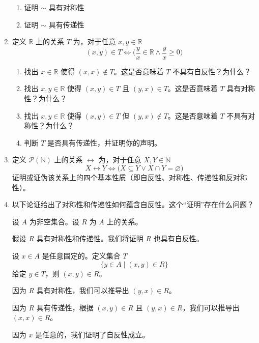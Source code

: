 \begin{enumerate}[label=(\arabic*)]
\begin{enumerate}[label=(\alph*)]
        \item 证明 $\sim$ 具有对称性
        \item 证明 $\sim$ 具有传递性
    \end{enumerate} \label{exc:exercises6.2.3}
    \item 定义 $\mathbb{R}$ 上的关系 $T$ 为，对于任意 $x, y \in \mathbb{R}$
    \[(x, y) \in T \iff \Big(\frac{y}{x} \in \mathbb{R} \land \frac{y}{x} \ge 0\Big)\]
    \begin{enumerate}[label=(\alph*)]
        \item 找出 $x \in \mathbb{R}$ 使得 $(x,x) \notin T$。这是否意味着 $T$ 不具有自反性？为什么？
        \item 找出 $x,y \in \mathbb{R}$ 使得 $(x,y) \in T$ 且 $(y,x) \in T$。这是否意味着 $T$ 具有对称性？为什么？
        \item 找出 $x,y \in \mathbb{R}$ 使得 $(x,y) \in T$ 但 $(y,x) \notin T$。这是否意味着 $T$ 不具有对称性？为什么？
        \item 判断 $T$ 是否具有传递性，并证明你的声明。
    \end{enumerate}
    \item 定义 $\mathcal{P}(\mathbb{N})$ 上的关系 $\leftrightarrow$ 为，对于任意 $X, Y \in \mathbb{N}$
    \[X \leftrightarrow Y \iff \Big(X \subseteq Y \lor X \cap Y = \varnothing \Big)\]
    证明或证伪该关系上的四个基本性质（即自反性、对称性、传递性和反对称性）。
    \item 以下论证给出了对称性和传递性如何蕴含自反性。这个``证明''存在什么问题？
    \begin{center}
        \noindent
            \parbox{0.85\textwidth}{%
                \linespread{1.5}\selectfont
                设 $A$ 为非空集合。设 $R$ 为 $A$ 上的关系。

                假设 $R$ 具有对称性和传递性。我们将证明 $R$ 也具有自反性。

                设 $x \in A$ 是任意固定的。定义集合 $T$
                \[\{y \in A \mid (x, y) \in R\}\]
                给定 $y \in T$，则 $(x, y) \in R$。

                因为 $R$ 具有对称性，我们可以推导出 $(y,x) \in R$。

                因为 $R$ 具有传递性，根据 $(x, y) \in R$ 且 $(y, x) \in R$，我们可以推导出 $(x,x) \in R$。

                因为 $x$ 是任意的，我们证明了自反性成立。 
            }
    \end{center}
\end{enumerate}
